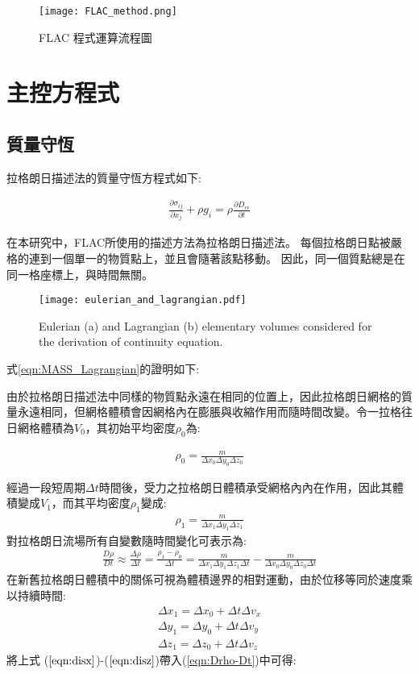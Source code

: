 \begin{figure*}[ht!]
    \centering
    \texttt{[image: FLAC\_method.png]}
    \caption{FLAC 程式運算流程圖
    }
    \label{fig::FLAC_method}
\end{figure*}

\section{主控方程式}

\subsection{質量守恆}

拉格朗日描述法的質量守恆方程式如下:

\begin{align}
\frac{\partial \sigma_{ij}}{\partial x_j}+\rho g_i = \rho \frac{\partial D_{vi}}{\partial t} 
\label{eqn:MASS_Lagrangian}
\end{align}

在本研究中，FLAC所使用的描述方法為拉格朗日描述法。
每個拉格朗日點被嚴格的連到一個單一的物質點上，並且會隨著該點移動。
因此，同一個質點總是在同一格座標上，與時間無關。

\begin{figure*}[ht!]
    \centering
    \texttt{[image: eulerian\_and\_lagrangian.pdf]}
    \caption{ Eulerian (a) and Lagrangian (b) elementary volumes considered for the derivation of continuity equation. }
    \label{fig::Lagrangian Volume}
\end{figure*}

式\ref{eqn:MASS_Lagrangian}的證明如下:

由於拉格朗日描述法中同樣的物質點永遠在相同的位置上，因此拉格朗日網格的質量永遠相同，但網格體積會因網格內在膨脹與收縮作用而隨時間改變。令一拉格往日網格體積為$V_0$，其初始平均密度$\rho_0$為:

\begin{align}
\rho_0 = \frac{m}{\Delta x_0 \Delta y_0 \Delta z_0}
\end{align}

經過一段短周期$\Delta t$時間後，受力之拉格朗日體積承受網格內內在作用，因此其體積變成$V_1$，而其平均密度$\rho_1$變成:
\begin{align}
\rho_1 = \frac{m}{\Delta x_1 \Delta y_1 \Delta z_1}
\end{align}
對拉格朗日流場所有自變數隨時間變化可表示為:
\begin{align}
\frac{D\rho}{Dt} \approx \frac{\Delta \rho}{\Delta t} = \frac{\rho_1-\rho_0}{\Delta t}=\frac{m}{\Delta x_1 \Delta y_1 \Delta z_1\Delta t}-\frac{m}{\Delta x_0 \Delta y_0 \Delta z_0\Delta t}\label{eqn:Drho-Dt}
\end{align}
在新舊拉格朗日體積中的關係可視為體積邊界的相對運動，由於位移等同於速度乘以持續時間:
\begin{align}
\Delta x_1 = \Delta x_0+\Delta t\Delta v_x\label{eqn:disx}\\ 
\Delta y_1 = \Delta y_0+\Delta t\Delta v_y\label{eqn:disy}\\
\Delta z_1 = \Delta z_0+\Delta t\Delta v_z\label{eqn:disz}
\end{align}
將上式 ($\ref{eqn:disx}$)-($\ref{eqn:disz}$)帶入(\ref{eqn:Drho-Dt})中可得:

